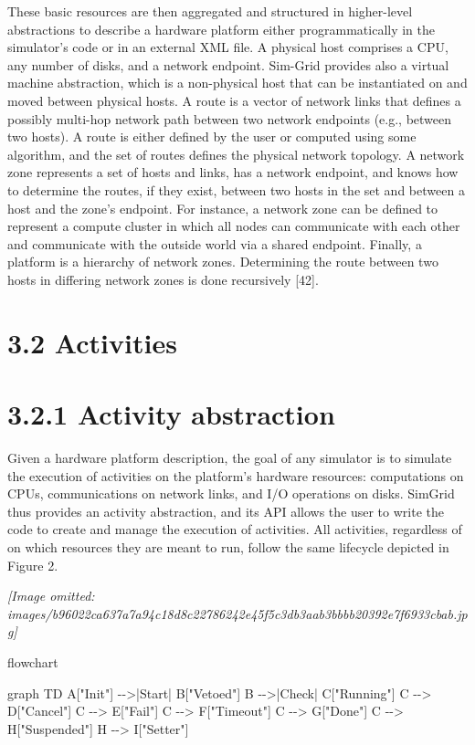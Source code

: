 \documentclass[
]{article}
\newenvironment{Shaded}{}{}
\newcommand{\NormalTok}[1]{#1}
\begin{document}
These basic resources are then aggregated and structured in higher-level
abstractions to describe a hardware platform either programmatically in
the simulator's code or in an external XML file. A physical host
comprises a CPU, any number of disks, and a network endpoint. Sim-Grid
provides also a virtual machine abstraction, which is a non-physical
host that can be instantiated on and moved between physical hosts. A
route is a vector of network links that defines a possibly multi-hop
network path between two network endpoints (e.g., between two hosts). A
route is either defined by the user or computed using some algorithm,
and the set of routes defines the physical network topology. A network
zone represents a set of hosts and links, has a network endpoint, and
knows how to determine the routes, if they exist, between two hosts in
the set and between a host and the zone's endpoint. For instance, a
network zone can be defined to represent a compute cluster in which all
nodes can communicate with each other and communicate with the outside
world via a shared endpoint. Finally, a platform is a hierarchy of
network zones. Determining the route between two hosts in differing
network zones is done recursively {[}42{]}.

\section{3.2 Activities}\label{activities}

\section{3.2.1 Activity abstraction}\label{activity-abstraction}

Given a hardware platform description, the goal of any simulator is to
simulate the execution of activities on the platform's hardware
resources: computations on CPUs, communications on network links, and
I/O operations on disks. SimGrid thus provides an activity abstraction,
and its API allows the user to write the code to create and manage the
execution of activities. All activities, regardless of on which
resources they are meant to run, follow the same lifecycle depicted in
Figure 2.

\textit{[Image omitted: images/b96022ca637a7a94c18d8c22786242e45f5c3db3aab3bbbb20392e7f6933cbab.jpg]}

flowchart

\begin{Shaded}
\begin{Highlighting}[]
\NormalTok{graph TD}
\NormalTok{    A["Init"] {-}{-}\textgreater{}|Start| B["Vetoed"]}
\NormalTok{    B {-}{-}\textgreater{}|Check| C["Running"]}
\NormalTok{    C {-}{-}\textgreater{} D["Cancel"]}
\NormalTok{    C {-}{-}\textgreater{} E["Fail"]}
\NormalTok{    C {-}{-}\textgreater{} F["Timeout"]}
\NormalTok{    C {-}{-}\textgreater{} G["Done"]}
\NormalTok{    C {-}{-}\textgreater{} H["Suspended"]}
\NormalTok{    H {-}{-}\textgreater{} I["Setter"]}
\end{Highlighting}
\end{Shaded}
\end{document}

